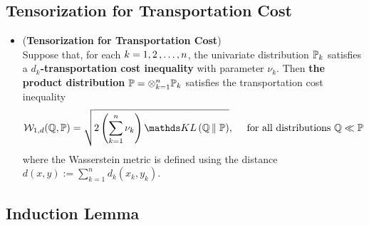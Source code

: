 \documentclass[11pt]{article}
\begin{document}
\subsection{Tensorization for Transportation Cost}
\begin{itemize}
\item \begin{proposition} (\textbf{Tensorization for Transportation Cost}) \citep{boucheron2013concentration}\\
Suppose that, for each $k = 1, 2 \,{,}\ldots{,}\, n$, the univariate distribution ${\mathbb P}_k$ satisfies a \textbf{$d_k$-transportation cost inequality} with parameter $\nu_k$. Then \textbf{the product distribution} ${\mathbb P} = \otimes_{k=1}^n {\mathbb P}_k$ satisfies the transportation cost inequality
\begin{align}
\cW_{1, d}(\bQ, \bP) &= \sqrt{2\paren{\sum_{k=1}^n \nu_k} \kl{\bQ}{\bP}}, \quad \text{ for all distributions $\bQ \ll \bP$ } \label{ineqn: tensorization_transport_cost}
\end{align}  where the Wasserstein metric is defined using the distance $d(x, y) :=  \sum_{k=1}^{n}d_k(x_k, y_k)$.
\end{proposition}
\end{itemize}

\subsection{Induction Lemma}
\end{document}
